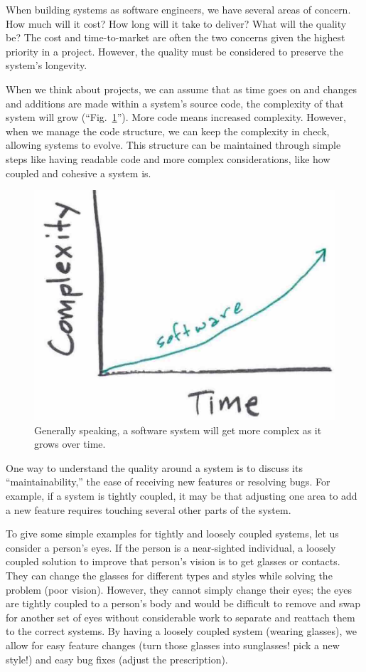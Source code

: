 \documentclass[12pt,conference]{IEEEtran}
\begin{document}
When building systems as software engineers, we have several areas of concern. How much will it cost? How long will it take to deliver? What will the quality be? The cost and time-to-market are often the two concerns given the highest priority in a project. However, the quality must be considered to preserve the system's longevity.

When we think about projects, we can assume that as time goes on and changes and additions are made within a system's source code, the complexity of that system will grow (``Fig.~\ref{figTimeAndComplexity}''). More code means increased complexity. However, when we manage the code structure, we can keep the complexity in check, allowing systems to evolve. This structure can be maintained through simple steps like having readable code and more complex considerations, like how coupled and cohesive a system is.

\begin{figure}[ht]
    \centerline{
        \includegraphics[width=0.7\columnwidth]{TimeAndComplexity}
    }
    \caption{Generally speaking, a software system will get more complex as it grows over time.}
    \label{figTimeAndComplexity}
\end{figure}

One way to understand the quality around a system is to discuss its ``maintainability,'' the ease of receiving new features or resolving bugs. For example, if a system is tightly coupled, it may be that adjusting one area to add a new feature requires touching several other parts of the system.

To give some simple examples for tightly and loosely coupled systems, let us consider a person's eyes. If the person is a near-sighted individual, a loosely coupled solution to improve that person's vision is to get glasses or contacts. They can change the glasses for different types and styles while solving the problem (poor vision). However, they cannot simply change their eyes; the eyes are tightly coupled to a person's body and would be difficult to remove and swap for another set of eyes without considerable work to separate and reattach them to the correct systems. By having a loosely coupled system (wearing glasses), we allow for easy feature changes (turn those glasses into sunglasses! pick a new style!) and easy bug fixes (adjust the prescription).
\end{document}
